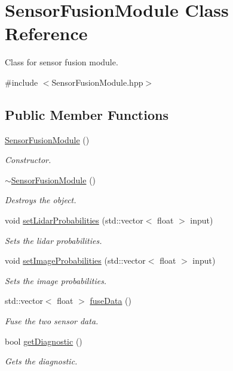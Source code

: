 \hypertarget{class_sensor_fusion_module}{}\section{Sensor\+Fusion\+Module Class Reference}
\label{class_sensor_fusion_module}


Class for sensor fusion module.  




{\ttfamily \#include $<$Sensor\+Fusion\+Module.\+hpp$>$}

\subsection*{Public Member Functions}
\begin{DoxyCompactItemize}
\item 
\hyperlink{class_sensor_fusion_module_a197b81625100b2b15d339be6fc15c657}{Sensor\+Fusion\+Module} ()
\begin{DoxyCompactList}\small\item\em Constructor. \end{DoxyCompactList}\item 
\hyperlink{class_sensor_fusion_module_a771099181db2311c47a13b56b93819fb}{$\sim$\+Sensor\+Fusion\+Module} ()\hypertarget{class_sensor_fusion_module_a771099181db2311c47a13b56b93819fb}{}\label{class_sensor_fusion_module_a771099181db2311c47a13b56b93819fb}

\begin{DoxyCompactList}\small\item\em Destroys the object. \end{DoxyCompactList}\item 
void \hyperlink{class_sensor_fusion_module_aa1b418548d329fd79a498edfc476d2b2}{set\+Lidar\+Probabilities} (std\+::vector$<$ float $>$ input)
\begin{DoxyCompactList}\small\item\em Sets the lidar probabilities. \end{DoxyCompactList}\item 
void \hyperlink{class_sensor_fusion_module_af169a79d8e241ba090b13b079d173080}{set\+Image\+Probabilities} (std\+::vector$<$ float $>$ input)
\begin{DoxyCompactList}\small\item\em Sets the image probabilities. \end{DoxyCompactList}\item 
std\+::vector$<$ float $>$ \hyperlink{class_sensor_fusion_module_a13d1756444b5d5e984aed678bed30103}{fuse\+Data} ()
\begin{DoxyCompactList}\small\item\em Fuse the two sensor data. \end{DoxyCompactList}\item 
bool \hyperlink{class_sensor_fusion_module_a8bb7397254888c4204ceeb9540659d4a}{get\+Diagnostic} ()
\begin{DoxyCompactList}\small\item\em Gets the diagnostic. \end{DoxyCompactList}\end{DoxyCompactItemize}


